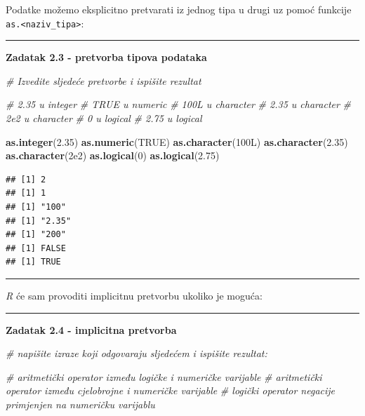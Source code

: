 \documentclass[]{book}
\newenvironment{Shaded}{\begin{snugshade}}{\end{snugshade}}
\newcommand{\KeywordTok}[1]{\textcolor[rgb]{0.13,0.29,0.53}{\textbf{#1}}}
\newcommand{\DecValTok}[1]{\textcolor[rgb]{0.00,0.00,0.81}{#1}}
\newcommand{\FloatTok}[1]{\textcolor[rgb]{0.00,0.00,0.81}{#1}}
\newcommand{\CommentTok}[1]{\textcolor[rgb]{0.56,0.35,0.01}{\textit{#1}}}
\newcommand{\OtherTok}[1]{\textcolor[rgb]{0.56,0.35,0.01}{#1}}
\newcommand{\NormalTok}[1]{#1}
\theoremstyle{definition}
\theoremstyle{definition}
\theoremstyle{definition}
\theoremstyle{remark}
\begin{document}
Podatke možemo eksplicitno pretvarati iz jednog tipa u drugi uz pomoć
funkcije \texttt{as.\textless{}naziv\_tipa\textgreater{}}:

\begin{center}\rule{0.5\linewidth}{\linethickness}\end{center}

\textbf{Zadatak 2.3 - pretvorba tipova podataka}

\begin{Shaded}
\begin{Highlighting}[]
\CommentTok{# Izvedite sljedeće pretvorbe i ispišite rezultat}

\CommentTok{#  2.35 u integer}
\CommentTok{#  TRUE u numeric}
\CommentTok{#  100L u character}
\CommentTok{#  2.35 u character}
\CommentTok{#  2e2  u character}
\CommentTok{#  0 u logical}
\CommentTok{#  2.75  u logical}
\end{Highlighting}
\end{Shaded}

\begin{Shaded}
\begin{Highlighting}[]
\KeywordTok{as.integer}\NormalTok{(}\FloatTok{2.35}\NormalTok{)}
\KeywordTok{as.numeric}\NormalTok{(}\OtherTok{TRUE}\NormalTok{)}
\KeywordTok{as.character}\NormalTok{(100L)}
\KeywordTok{as.character}\NormalTok{(}\FloatTok{2.35}\NormalTok{)}
\KeywordTok{as.character}\NormalTok{(}\FloatTok{2e2}\NormalTok{)}
\KeywordTok{as.logical}\NormalTok{(}\DecValTok{0}\NormalTok{)}
\KeywordTok{as.logical}\NormalTok{(}\FloatTok{2.75}\NormalTok{)}
\end{Highlighting}
\end{Shaded}

\begin{verbatim}
## [1] 2
## [1] 1
## [1] "100"
## [1] "2.35"
## [1] "200"
## [1] FALSE
## [1] TRUE
\end{verbatim}

\begin{center}\rule{0.5\linewidth}{\linethickness}\end{center}

\emph{R} će sam provoditi implicitnu pretvorbu ukoliko je moguća:

\begin{center}\rule{0.5\linewidth}{\linethickness}\end{center}

\textbf{Zadatak 2.4 - implicitna pretvorba}

\begin{Shaded}
\begin{Highlighting}[]
\CommentTok{# napišite izraze koji odgovaraju sljedećem i ispišite rezultat:}

\CommentTok{# aritmetički operator između logičke i numeričke varijable}
\CommentTok{# aritmetički operator između cjelobrojne i numeričke varijable}
\CommentTok{# logički operator negacije primjenjen na numeričku varijablu}
\end{Highlighting}
\end{Shaded}
\end{document}
